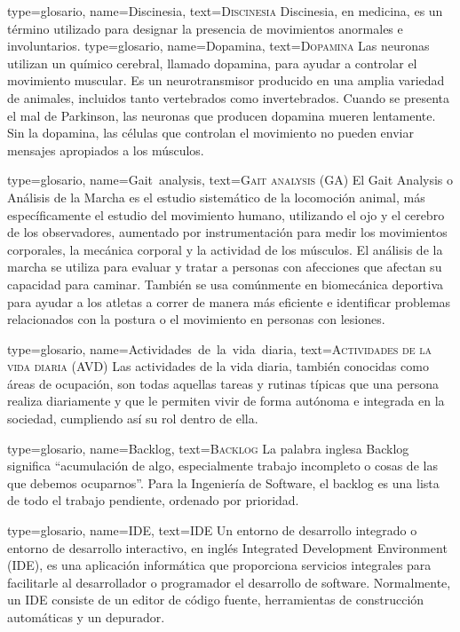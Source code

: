 {
type={glosario},
name={Discinesia},
text={\textsc{Discinesia}}
}
{Discinesia, en medicina, es un término utilizado para designar la presencia de movimientos anormales e involuntarios.
}
{
type={glosario},
name={Dopamina},
text={\textsc{Dopamina}}
}
{ Las neuronas utilizan un químico cerebral, llamado dopamina, para ayudar a controlar el movimiento muscular. Es un neurotransmisor producido en una amplia variedad de animales, incluidos tanto vertebrados como invertebrados. Cuando se presenta el mal de Parkinson, las neuronas que producen dopamina mueren lentamente. Sin la dopamina, las células que controlan el movimiento no pueden enviar mensajes apropiados a los músculos.
}

{
type={glosario},
name={Gait~analysis},
text={\textsc{Gait analysis (GA)}}
}
{ El Gait Analysis o Análisis de la Marcha es el estudio sistemático de la locomoción animal, más específicamente el estudio del movimiento humano, utilizando el ojo y el cerebro de los observadores, aumentado por instrumentación para medir los movimientos corporales, la mecánica corporal y la actividad de los músculos. El análisis de la marcha se utiliza para evaluar y tratar a personas con afecciones que afectan su capacidad para caminar. También se usa comúnmente en biomecánica deportiva para ayudar a los atletas a correr de manera más eficiente e identificar problemas relacionados con la postura o el movimiento en personas con lesiones.
}

{
type={glosario},
name={Actividades~de~la~vida~diaria},
text={\textsc{Actividades de la vida diaria (AVD)}}
}
{ Las actividades de la vida diaria, también conocidas como áreas de ocupación, son todas aquellas tareas y rutinas típicas que una persona realiza diariamente y que le permiten vivir de forma autónoma e integrada en la sociedad, cumpliendo así su rol dentro de ella.
}


{
type={glosario},
name={Backlog},
text={\textsc{Backlog}}
}{La palabra inglesa Backlog significa ``acumulación de algo, especialmente trabajo incompleto o cosas de las que debemos ocuparnos''. Para la Ingeniería de Software, el backlog es una lista de todo el trabajo pendiente, ordenado por prioridad.
}


{
type={glosario},
name={IDE},
text={\textsc{IDE}}
}{Un entorno de desarrollo integrado o entorno de desarrollo interactivo, en inglés Integrated Development Environment (IDE), es una aplicación informática que proporciona servicios integrales para facilitarle al desarrollador o programador el desarrollo de software. Normalmente, un IDE consiste de un editor de código fuente, herramientas de construcción automáticas y un depurador.
}

